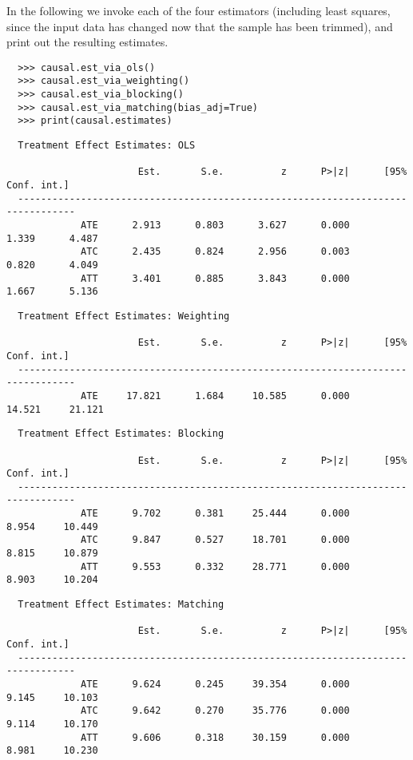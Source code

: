 \documentclass[12pt]{article}
\theoremstyle{definition}
\theoremstyle{definition}
\theoremstyle{definition}
\theoremstyle{remark}
\begin{document}
In the following we invoke each of the four estimators (including least squares, since the input data has changed now that the sample has been trimmed), and print out the resulting estimates.
\begin{verbatim}
  >>> causal.est_via_ols()
  >>> causal.est_via_weighting()
  >>> causal.est_via_blocking()
  >>> causal.est_via_matching(bias_adj=True)
  >>> print(causal.estimates)
\end{verbatim}
\begin{verbatim}
  Treatment Effect Estimates: OLS
  
                       Est.       S.e.          z      P>|z|      [95% Conf. int.]
  --------------------------------------------------------------------------------
             ATE      2.913      0.803      3.627      0.000      1.339      4.487
             ATC      2.435      0.824      2.956      0.003      0.820      4.049
             ATT      3.401      0.885      3.843      0.000      1.667      5.136
\end{verbatim}
\begin{verbatim}
  Treatment Effect Estimates: Weighting
  
                       Est.       S.e.          z      P>|z|      [95% Conf. int.]
  --------------------------------------------------------------------------------
             ATE     17.821      1.684     10.585      0.000     14.521     21.121
\end{verbatim}
\begin{verbatim}
  Treatment Effect Estimates: Blocking
  
                       Est.       S.e.          z      P>|z|      [95% Conf. int.]
  --------------------------------------------------------------------------------
             ATE      9.702      0.381     25.444      0.000      8.954     10.449
             ATC      9.847      0.527     18.701      0.000      8.815     10.879
             ATT      9.553      0.332     28.771      0.000      8.903     10.204
\end{verbatim}
\begin{verbatim}
  Treatment Effect Estimates: Matching
  
                       Est.       S.e.          z      P>|z|      [95% Conf. int.]
  --------------------------------------------------------------------------------
             ATE      9.624      0.245     39.354      0.000      9.145     10.103
             ATC      9.642      0.270     35.776      0.000      9.114     10.170
             ATT      9.606      0.318     30.159      0.000      8.981     10.230
\end{verbatim}
\end{document}
